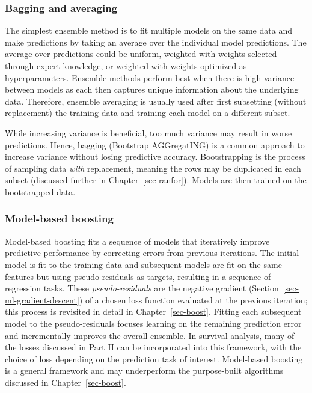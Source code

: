 \documentclass[
  letterpaper,
  krantz2]{style/krantz}
\begin{document}
\subsubsection{Bagging and averaging}\label{bagging-and-averaging}

The simplest ensemble method is to fit multiple models on the same data
and make predictions by taking an average over the individual model
predictions. The average over predictions could be
uniform, weighted with weights selected through expert knowledge, or
weighted with weights optimized as hyperparameters. Ensemble methods
perform best when there is high variance between models as each then
captures unique information about the underlying data. Therefore,
ensemble averaging is usually used after first subsetting (without
replacement) the training data and training each model on a different
subset.

While increasing variance is beneficial, too much variance may result in
worse predictions. Hence, bagging (Bootstrap AGGregatING) is a common
approach to increase variance without losing predictive accuracy.
Bootstrapping is the process of sampling data \emph{with} replacement,
meaning the rows may be duplicated in each subset (discussed further in
Chapter~\ref{sec-ranfor}). Models are then trained on the bootstrapped
data.

\subsubsection{Model-based boosting}\label{model-based-boosting}

Model-based boosting fits a sequence of models that iteratively improve
predictive performance by correcting errors from previous
iterations. The initial model is fit to the training
data and subsequent models are fit on the same features but using
pseudo-residuals as targets, resulting in a sequence of regression
tasks. These \emph{pseudo-residuals} are the negative gradient
(Section~\ref{sec-ml-gradient-descent}) of a chosen loss function
evaluated at the previous iteration; this process is revisited in detail
in Chapter~\ref{sec-boost}. 
 Fitting each subsequent model to the
pseudo-residuals focuses learning on the remaining prediction error and
incrementally improves the overall ensemble. In survival analysis, many
of the losses discussed in Part II can be incorporated into this
framework, with the choice of loss depending on the prediction task of
interest. Model-based boosting is a general framework and may
underperform the purpose-built algorithms discussed in
Chapter~\ref{sec-boost}.
\end{document}
